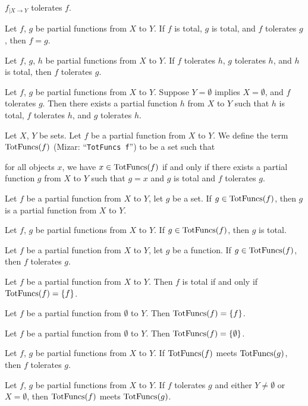 \documentclass{article}
\begin{document}
\begin{thm}
\item\label{partfun1:65} $f_{|X\to Y}$ tolerates $f$.
\item\label{partfun1:66} Let $f$, $g$ be partial functions from $X$ to
  $Y$.
  If $f$ is total, $g$ is total, and $f$ tolerates $g$,
  then $f=g$.
\item\label{partfun1:67} Let $f$, $g$, $h$ be partial functions from $X$
  to $Y$. If $f$ tolerates $h$, $g$ tolerates $h$, and $h$ is total,
  then $f$ tolerates $g$.
\item\label{partfun1:68} Let $f$, $g$ be partial functions from $X$ to $Y$.
  Suppose $Y=\emptyset$ implies $X=\emptyset$, and $f$ tolerates $g$.
  Then there exists a partial function $h$ from $X$ to $Y$ such that
  $h$ is total, $f$ tolerates $h$, and $g$ tolerates $h$.
\end{thm}

\begin{definition}
Let $X$, $Y$ be sets.
Let $f$ be a partial function from $X$ to $Y$.
We define the term $\operatorname{TotFuncs}(f)$ (Mizar: ``\verb#TotFuncs f#'') to be a set 
such that
\begin{defn}
\item for all objects $x$, we have $x\in\operatorname{TotFuncs}(f)$ if and only if
  there exists a partial function $g$ from $X$ to $Y$ such that $g=x$
  and $g$ is total and $f$ tolerates $g$.
\end{defn}
\end{definition}

\begin{thm}
\item\label{partfun1:69} Let $f$ be a partial function from $X$ to $Y$,
  let $g$ be a set. If $g\in\operatorname{TotFuncs}(f)$, then $g$ is a partial
  function from $X$ to $Y$.
\item\label{partfun1:70} Let $f$, $g$ be partial functions from $X$ to $Y$.
  If $g\in\operatorname{TotFuncs}(f)$, then $g$ is total.
\item\label{partfun1:71} Let $f$ be a partial function from $X$ to $Y$,
  let $g$ be a function. If $g\in\operatorname{TotFuncs}(f)$, then $f$ tolerates $g$.
\item\label{partfun1:72} Let $f$ be a partial function from $X$ to $Y$.
  Then $f$ is total if and only if $\operatorname{TotFuncs}(f)=\{f\}$.
\item\label{partfun1:73} Let $f$ be a partial function from
  $\emptyset$ to $Y$. Then $\operatorname{TotFuncs}(f)=\{f\}$.
\item\label{partfun1:74} Let $f$ be a partial function from $\emptyset$
  to $Y$. Then $\operatorname{TotFuncs}(f)=\{\emptyset\}$.
\item\label{partfun1:75} Let $f$, $g$ be partial functions from $X$ to $Y$.
  If $\operatorname{TotFuncs}(f)$ meets $\operatorname{TotFuncs}(g)$, then $f$ tolerates $g$.
\item\label{partfun1:76} Let $f$, $g$ be partial functions from $X$ to $Y$.
  If $f$ tolerates $g$ and either $Y\neq\emptyset$ or $X=\emptyset$,
  then $\operatorname{TotFuncs}(f)$ meets $\operatorname{TotFuncs}(g)$.
\end{thm}
\end{document}
